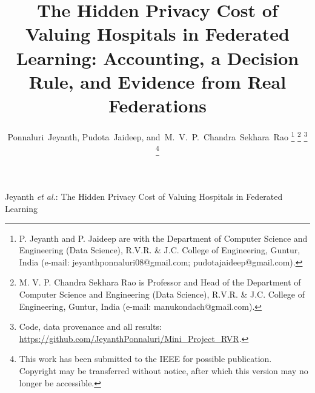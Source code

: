 \documentclass[journal]{IEEEtran}
\begin{document}
\title{The Hidden Privacy Cost of Valuing Hospitals in Federated Learning: Accounting, a Decision Rule, and Evidence from Real Federations}

\author{Ponnaluri~Jeyanth,
        Pudota~Jaideep,
        and~M.~V.~P.~Chandra~Sekhara~Rao%
\thanks{P. Jeyanth and P. Jaideep are with the Department of Computer Science and Engineering (Data Science), R.V.R. \& J.C. College of Engineering, Guntur, India (e-mail: jeyanthponnaluri08@gmail.com; pudotajaideep@gmail.com).}%
\thanks{M. V. P. Chandra Sekhara Rao is Professor and Head of the Department of Computer Science and Engineering (Data Science), R.V.R. \& J.C. College of Engineering, Guntur, India (e-mail: manukondach@gmail.com).}%
\thanks{Code, data provenance and all results: \protect\url{https://github.com/JeyanthPonnaluri/Mini_Project_RVR}.}%
\thanks{This work has been submitted to the IEEE for possible publication. Copyright may be transferred without notice, after which this version may no longer be accessible.}}

%
{Jeyanth \MakeLowercase{\textit{et al.}}: The Hidden Privacy Cost of Valuing Hospitals in Federated Learning}

\maketitle
\end{document}
